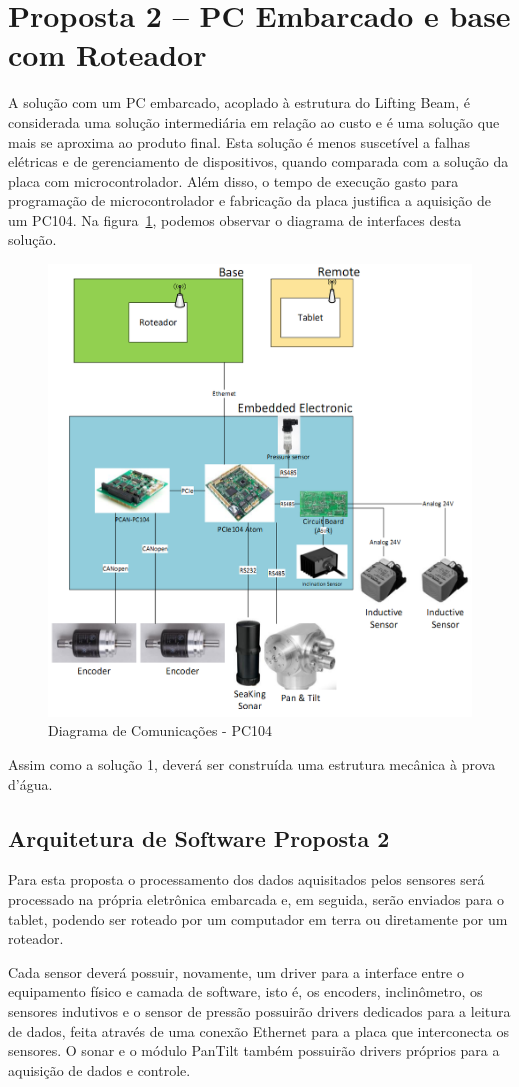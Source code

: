 \section{Proposta 2 – PC Embarcado e base com Roteador}

A solução com um PC embarcado, acoplado à estrutura do Lifting Beam, é
considerada uma solução intermediária em relação ao custo e é uma solução que
mais se aproxima ao produto final. Esta solução é menos suscetível a falhas
elétricas e de gerenciamento de dispositivos, quando comparada com a solução da
placa com microcontrolador. Além disso, o tempo de execução gasto para programação de microcontrolador e fabricação da placa justifica a aquisição de um PC104. Na figura~\ref{pc104}, podemos observar o diagrama de interfaces desta solução.

\begin{figure}[H]
    \centering
    \includegraphics[width=0.5\columnwidth]{figs/eletronica/4.png}
    \caption{Diagrama de Comunicações - PC104}
    \label{pc104}
\end{figure} 
 
Assim como a solução 1, deverá ser construída uma estrutura mecânica à prova d’água.

\subsection{Arquitetura de Software Proposta 2}

Para esta proposta o processamento dos dados aquisitados pelos sensores será
processado na própria eletrônica embarcada e, em seguida,
 serão enviados para o tablet, podendo ser roteado por um computador em terra ou
 diretamente por um roteador.
 
Cada sensor deverá possuir, novamente, um driver para a interface entre o
equipamento físico e camada de software,
 isto é, os encoders, inclinômetro, os sensores indutivos e o sensor de pressão
 possuirão drivers dedicados para a leitura de dados,
feita através de uma conexão Ethernet para a placa que interconecta os sensores.
O sonar e o módulo PanTilt também possuirão drivers próprios para a aquisição de
dados e controle.

